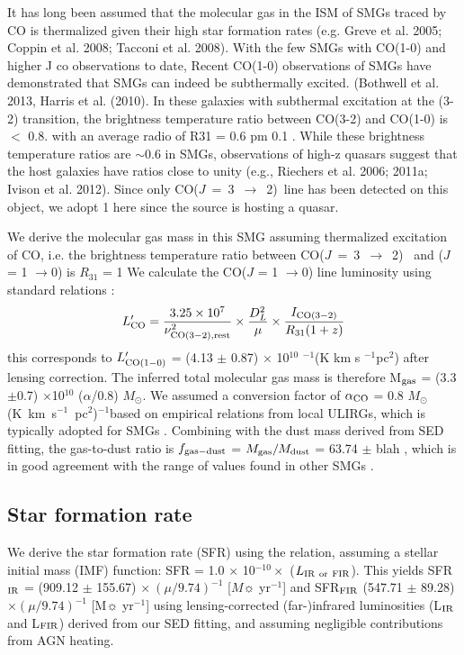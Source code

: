 \documentclass[twocolumn,apj,numberedappendix]{emulateapj}
\newcommand{\Msun}{\mbox{$M_{\odot}$}}
\newcommand{\rarr}{$\rightarrow$}
\newcommand{\CO}{\mbox{CO($J$ = 3 $\rightarrow$ 2) }}
\newcommand{\LpU}{\mbox{K km s$^{-1}$ pc$^2$}}
\newcommand{\eg}{{\sl e.g.,~}}
\newcommand{\pmOne}{$^{-1}$}
\begin{document}
It has long been assumed that the molecular gas in the ISM of SMGs traced by CO is thermalized given their high star formation rates (e.g. Greve et al. 2005; Coppin et al. 2008; Tacconi et al. 2008). With the few SMGs with CO(1-0) and higher J co observations to date,
Recent CO(1-0) observations of SMGs have demonstrated that SMGs can indeed be subthermally excited. (Bothwell et al. 2013, Harris et al. (2010). In these galaxies with subthermal excitation at the (3-2) transition, the brightness temperature ratio between CO(3-2) and CO(1-0) is $<$ 0.8. with an average radio of R31 = 0.6 pm 0.1 \citep[\eg][]{Harris10a,Carilli10a,Swinbank2010a,Ivison11a,Ivison10d}. While these brightness temperature ratios are $\sim$0.6 in SMGs, observations of high-z quasars suggest that the host galaxies have ratios close to unity (e.g., Riechers 
et al. 2006; 2011a; Ivison et al. 2012). Since only \CO line has been detected on this object, we adopt 1 here since the source is hosting a quasar.

We derive the molecular gas mass in
this SMG assuming thermalized excitation of CO, i.e. the brightness temperature ratio 
between \CO
and ($J$ = 1 \rarr 0) is $R_{31}$ = 1 \citep[\eg][and references therein]{Riechers11a,Scott11a}
We calculate the CO($J$ = 1 \rarr 0) line luminosity using standard relations 
\citep[\eg][]{Solomon05a,Carilli13a}:
\begin{equation}
L^{\prime}_{\rm CO} = \frac{3.25\times10^7}{\nu_{\rm CO (3-2), rest}^2}\times \frac{D_L^2}{\mu} \times
\frac{I_{\rm CO(3-2)}} {R_{\rm 31} (1 + z)}
\end{equation}
this corresponds to $L^{\prime}_{\rm CO (1-0)}$ = (4.13 $\pm$ 0.87) $\times$ 10$^{10}$ \pmOne (\rm K km s
\pmOne pc$^2$)
after lensing correction. The inferred total molecular gas mass is therefore M$_{\rm gas}$ = (3.3$\pm$0.7) $\times
$10$^{10}$ ($\alpha$/0.8) \Msun. We assumed a conversion factor of $\alpha_{\rm CO}$ =
0.8 \Msun (\LpU)\pmOne based on empirical relations from local ULIRGs, which is typically
adopted for SMGs \citep{Bothwell13a,Tacconi10a,Daddi2010a}. 
Combining with the dust mass derived from SED fitting, the gas-to-dust
ratio is $f_{\rm gas-dust}$ = $M_{\rm gas}/M_{\rm dust}$ = 63.74 $\pm$ blah , which is in good agreement with the range 
of values found in other SMGs \citep{Coppin08a}.


\subsection{Star formation rate}
We derive the star formation rate (SFR) using the \citet{Kennicutt98a} relation, assuming a \citet{Chabrier03a}
stellar initial mass (IMF) function: SFR = 1.0 $\times$ 10$^{-10}\times$ ($L_{\rm IR\ or\ FIR}$). This yields SFR$_{\rm IR}$ 
= (909.12 $\pm$ 155.67) $\times\ (\mu/9.74)^{-1}$ [$M\sun$ yr\pmOne] and SFR$_{\rm FIR}$ (547.71 $\pm$ 89.28) $\times(\mu/9.74)^{-1}$ [M$
\sun$ yr\pmOne] using lensing-corrected (far-)infrared luminosities (L$_{\rm IR}$ and L$_{\rm FIR}$) derived from our SED 
fitting, and assuming negligible contributions from AGN heating.
\end{document}
